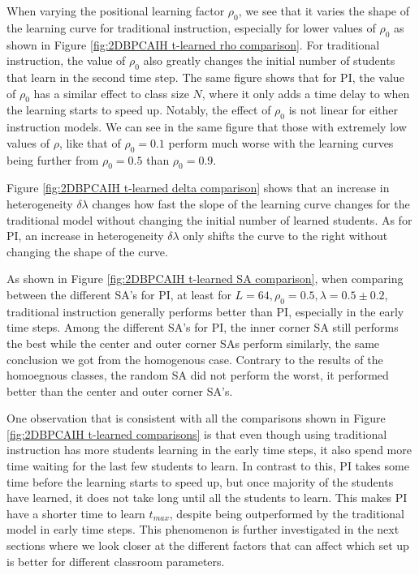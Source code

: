 When varying the positional learning factor $\rho_0$, we see that it varies the shape of the learning curve for traditional instruction, especially for lower values of $\rho_0$ as shown in Figure \ref{fig:2DBPCAIH t-learned rho comparison}. 
For traditional instruction, the value of $\rho_0$ also greatly changes the initial number of students that learn in the second time step.
The same figure shows that for PI, the value of $\rho_0$ has a similar effect to class size $N$, where it only adds a time delay to when the learning starts to speed up.
Notably, the effect of $\rho_0$ is not linear for either instruction models.
We can see in the same figure that those with extremely low values of $\rho$, like that of $\rho_0=0.1$ perform much worse with the learning curves being further from $\rho_0=0.5$ than $\rho_0=0.9$.

Figure \ref{fig:2DBPCAIH t-learned delta comparison} shows that an increase in heterogeneity $\delta\lambda$ changes how fast the slope of the learning curve changes for the traditional model without changing the initial number of learned students. 
As for PI, an increase in heterogeneity $\delta\lambda$  only shifts the curve to the right without changing the shape of the curve.

As shown in Figure \ref{fig:2DBPCAIH t-learned SA comparison}, when comparing between the different SA's for PI, at least for $L=64, \rho_0=0.5, \lambda=0.5\pm0.2$, traditional instruction generally performs better than PI, especially in the early time steps. 
Among the different SA's for PI, the inner corner SA still performs the best while the center and outer corner SAs perform similarly, the same conclusion we got from the homogenous case.
Contrary to the results of the homoegnous classes, the random SA did not perform the worst, it performed better than the center and outer corner SA's.

One observation that is consistent with all the comparisons shown in Figure \ref{fig:2DBPCAIH t-learned comparisons} is that even though using traditional instruction has more students learning in the early time steps, it also spend more time waiting for the last few students to learn. 
In contrast to this, PI takes some time before the learning starts to speed up, but once majority of the students have learned, it does not take long until all the students to learn.
This makes PI have a shorter time to learn $t_{max}$, despite being outperformed by the traditional model in early time steps.
This phenomenon is further investigated in the next sections where we look closer at the different factors that can affect which set up is better for different classroom parameters.

